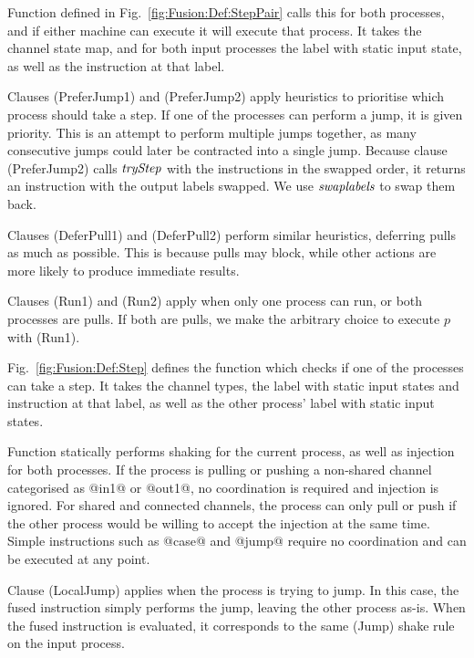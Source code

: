 

Function  defined in Fig.~\ref{fig:Fusion:Def:StepPair} calls this for both processes, and if either machine can execute it will execute that process.
It takes the channel state map, and for both input processes the label with static input state, as well as the instruction at that label.

Clauses (PreferJump1) and (PreferJump2) apply heuristics to prioritise which process should take a step. If one of the processes can perform a jump, it is given priority. This is an attempt to perform multiple jumps together, as many consecutive jumps could later be contracted into a single jump.
Because clause (PreferJump2) calls $\textit{tryStep}$ with the instructions in the swapped order, it returns an instruction with the output labels swapped. We use $\textit{swaplabels}$ to swap them back.

Clauses (DeferPull1) and (DeferPull2) perform similar heuristics, deferring pulls as much as possible.
This is because pulls may block, while other actions are more likely to produce immediate results.

Clauses (Run1) and (Run2) apply when only one process can run, or both processes are pulls.
If both are pulls, we make the arbitrary choice to execute $p$ with (Run1).



Fig.~\ref{fig:Fusion:Def:Step} defines the  function which checks if one of the processes can take a step.
It takes the channel types, the label with static input states and instruction at that label, as well as the other process' label with static input states.

Function  statically performs shaking for the current process, as well as injection for both processes.
If the process is pulling or pushing a non-shared channel categorised as @in1@ or @out1@, no coordination is required and injection is ignored.
For shared and connected channels, the process can only pull or push if the other process would be willing to accept the injection at the same time.
Simple instructions such as @case@ and @jump@ require no coordination and can be executed at any point.

Clause (LocalJump) applies when the process is trying to jump.
In this case, the fused instruction simply performs the jump, leaving the other process as-is.
When the fused instruction is evaluated, it corresponds to the same (Jump) shake rule on the input process.

